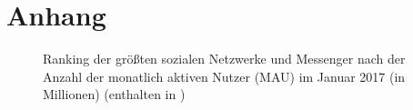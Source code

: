\chapter{Anhang}

\begin{figure}[!htbp]
	\caption[Ranking der größten sozialen Netzwerke und Messenger nach der Anzahl der monatlich aktiven Nutzer (MAU) im Januar 2017 (in Millionen)]{Ranking der größten sozialen Netzwerke und Messenger nach der Anzahl der monatlich aktiven Nutzer (MAU) im Januar 2017 (in Millionen) (enthalten in \cite[][]{WeAreSocial.2017})}
	\label{fig:ranking}
\end{figure}
